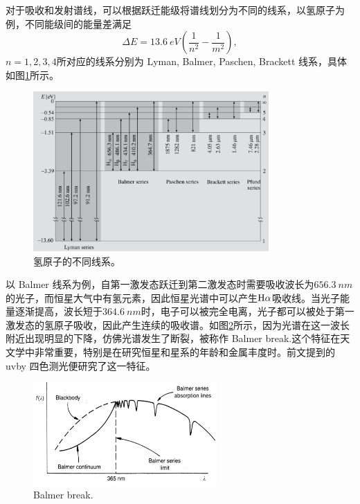 \documentclass[../天体物理基础.tex]{subfiles}
\begin{document}
对于吸收和发射谱线，可以根据跃迁能级将谱线划分为不同的线系，以氢原子为例，不同能级间的能量差满足
\begin{equation}
\Delta{}E=\qty{13,6}{eV}\left(\frac{1}{n^{2}}-\frac{1}{m^{2}}\right),
\end{equation}
$n=1,2,3,4$所对应的线系分别为 Lyman, Balmer, Paschen, Brackett 线系，具体如图\ref{氢原子的不同线系。}所示。

\begin{figure}[!htbp]
\centering
\includegraphics[width=9cm]{figures/figure1_11.png}
\captionsetup{justification=raggedright, singlelinecheck=false}
\caption{氢原子的不同线系。}
\label{氢原子的不同线系。}
\end{figure}

以 Balmer 线系为例，自第一激发态跃迁到第二激发态时需要吸收波长为$\qty{656.3}{nm}$的光子，而恒星大气中有氢元素，因此恒星光谱中可以产生$\ce{H}\alpha$吸收线。当光子能量逐渐提高，波长短于$\qty{364.6}{nm}$时，电子可以被完全电离，光子都可以被处于第一激发态的氢原子吸收，因此产生连续的吸收谱。如图\ref{Balmer break.}所示，因为光谱在这一波长附近出现明显的下降，仿佛光谱发生了断裂，被称作 Balmer break.这个特征在天文学中非常重要，特别是在研究恒星和星系的年龄和金属丰度时。前文提到的 uvby 四色测光便研究了这一特征。
\begin{figure}[!htbp]
\centering
\includegraphics[width=7cm]{figures/figure1_12.png}
\captionsetup{justification=raggedright, singlelinecheck=false}
\caption{Balmer break.}
\label{Balmer break.}
\end{figure}
\end{document}
